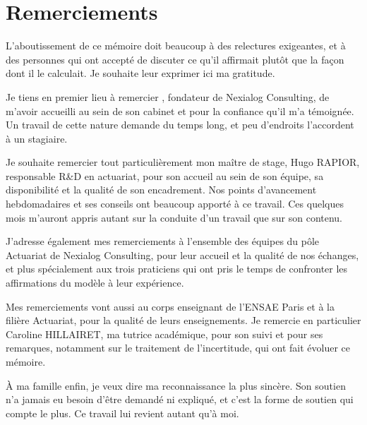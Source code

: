 \clearpage

\chapter*{Remerciements}

L'aboutissement de ce mémoire doit beaucoup à des relectures exigeantes, et à des
personnes qui ont accepté de discuter ce qu'il affirmait plutôt que la façon dont il le
calculait. Je souhaite leur exprimer ici ma gratitude.

Je tiens en premier lieu à remercier \fondateurnexialog, fondateur de Nexialog
Consulting, de m'avoir accueilli au sein de son cabinet et pour la confiance qu'il m'a
témoignée. Un travail de cette nature demande du temps long, et peu d'endroits
l'accordent à un stagiaire.

Je souhaite remercier tout particulièrement mon maître de stage, Hugo RAPIOR,
responsable R\&D en actuariat, pour son accueil au sein de son équipe, sa disponibilité
et la qualité de son encadrement. Nos points d'avancement hebdomadaires et ses conseils
ont beaucoup apporté à ce travail. Ces quelques mois m'auront appris autant sur la
conduite d'un travail que sur son contenu.

J'adresse également mes remerciements à l'ensemble des équipes du pôle Actuariat de
Nexialog Consulting, pour leur accueil et la qualité de nos échanges, et plus
spécialement aux trois praticiens qui ont pris le temps de confronter les affirmations
du modèle à leur expérience.


Mes remerciements vont aussi au corps enseignant de l'ENSAE Paris et à la filière
Actuariat, pour la qualité de leurs enseignements. Je remercie en particulier Caroline
HILLAIRET, ma tutrice académique, pour son suivi et pour ses remarques, notamment sur le
traitement de l'incertitude, qui ont fait évoluer ce mémoire.

À ma famille enfin, je veux dire ma reconnaissance la plus sincère. Son soutien n'a
jamais eu besoin d'être demandé ni expliqué, et c'est la forme de soutien qui compte le
plus. Ce travail lui revient autant qu'à moi.

\clearpage
